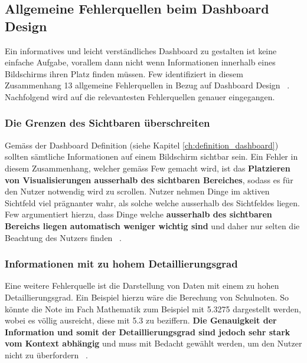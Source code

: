 \subsection{Allgemeine Fehlerquellen beim Dashboard Design}
Ein informatives und leicht verständliches Dashboard zu gestalten ist keine einfache Aufgabe, vorallem dann nicht wenn Informationen innerhalb eines Bildschirms ihren Platz finden müssen. Few identifiziert in diesem Zusammenhang 13 allgemeine Fehlerquellen in Bezug auf Dashboard Design ~\citep[S. 49]{information_dashboard_design}. Nachfolgend wird auf die relevantesten Fehlerquellen genauer eingegangen.

\subsubsection{Die Grenzen des Sichtbaren überschreiten}
Gemäss der Dashboard Definition (siehe Kapitel \ref{ch:definition_dashboard}) sollten sämtliche Informationen auf einem Bildschirm sichtbar sein. Ein Fehler in diesem Zusammenhang, welcher gemäss Few gemacht wird, ist das \textbf{Platzieren von Visualisierungen ausserhalb des sichtbaren Bereiches}, sodass es für den Nutzer notwendig wird zu scrollen. Nutzer nehmen Dinge im aktiven Sichtfeld viel prägnanter wahr, als solche welche ausserhalb des Sichtfeldes liegen. Few argumentiert hierzu, dass Dinge welche \textbf{ausserhalb des sichtbaren Bereichs liegen automatisch weniger wichtig sind} und daher nur selten die Beachtung des Nutzers finden ~\citep[S. 50-53]{information_dashboard_design}.

\subsubsection{Informationen mit zu hohem Detaillierungsgrad}
Eine weitere Fehlerquelle ist die Darstellung von Daten mit einem zu hohen Detaillierungsgrad. Ein Beispiel hierzu wäre die Berechung von Schulnoten. So könnte die Note im Fach Mathematik zum Beispiel mit 5.3275 dargestellt werden, wobei es völlig ausreicht, diese mit 5.3 zu beziffern. \textbf{Die Genauigkeit der Information und somit der Detaillierungsgrad sind jedoch sehr stark vom Kontext abhängig} und muss mit Bedacht gewählt werden, um den Nutzer nicht zu überfordern ~\citep[S. 55-56]{information_dashboard_design}.

